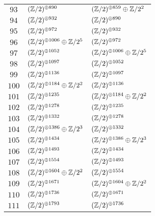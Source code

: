 \begin{supertabular}{|c|p{5.5cm}|p{5.5cm}|}
$93$%
&$(\mathbb{Z}/2)^{\oplus890}$%
&$(\mathbb{Z}/2)^{\oplus859}\oplus\mathbb{Z}/2^{2}$\\

$94$%
&$(\mathbb{Z}/2)^{\oplus932}$%
&$(\mathbb{Z}/2)^{\oplus890}$\\

$95$%
&$(\mathbb{Z}/2)^{\oplus972}$%
&$(\mathbb{Z}/2)^{\oplus932}$\\

$96$%
&$(\mathbb{Z}/2)^{\oplus1006}\oplus\mathbb{Z}/2^{5}$%
&$(\mathbb{Z}/2)^{\oplus972}$\\

$97$%
&$(\mathbb{Z}/2)^{\oplus1052}$%
&$(\mathbb{Z}/2)^{\oplus1006}\oplus\mathbb{Z}/2^{5}$\\

$98$%
&$(\mathbb{Z}/2)^{\oplus1097}$%
&$(\mathbb{Z}/2)^{\oplus1052}$\\

$99$%
&$(\mathbb{Z}/2)^{\oplus1136}$%
&$(\mathbb{Z}/2)^{\oplus1097}$\\

$100$%
&$(\mathbb{Z}/2)^{\oplus1184}\oplus\mathbb{Z}/2^{2}$%
&$(\mathbb{Z}/2)^{\oplus1136}$\\

$101$%
&$(\mathbb{Z}/2)^{\oplus1235}$%
&$(\mathbb{Z}/2)^{\oplus1184}\oplus\mathbb{Z}/2^{2}$\\

$102$%
&$(\mathbb{Z}/2)^{\oplus1278}$%
&$(\mathbb{Z}/2)^{\oplus1235}$\\

$103$%
&$(\mathbb{Z}/2)^{\oplus1332}$%
&$(\mathbb{Z}/2)^{\oplus1278}$\\

$104$%
&$(\mathbb{Z}/2)^{\oplus1386}\oplus\mathbb{Z}/2^{3}$%
&$(\mathbb{Z}/2)^{\oplus1332}$\\

$105$%
&$(\mathbb{Z}/2)^{\oplus1434}$%
&$(\mathbb{Z}/2)^{\oplus1386}\oplus\mathbb{Z}/2^{3}$\\

$106$%
&$(\mathbb{Z}/2)^{\oplus1493}$%
&$(\mathbb{Z}/2)^{\oplus1434}$\\

$107$%
&$(\mathbb{Z}/2)^{\oplus1554}$%
&$(\mathbb{Z}/2)^{\oplus1493}$\\

$108$%
&$(\mathbb{Z}/2)^{\oplus1604}\oplus\mathbb{Z}/2^{2}$%
&$(\mathbb{Z}/2)^{\oplus1554}$\\

$109$%
&$(\mathbb{Z}/2)^{\oplus1671}$%
&$(\mathbb{Z}/2)^{\oplus1604}\oplus\mathbb{Z}/2^{2}$\\

$110$%
&$(\mathbb{Z}/2)^{\oplus1736}$%
&$(\mathbb{Z}/2)^{\oplus1671}$\\

$111$%
&$(\mathbb{Z}/2)^{\oplus1793}$%
&$(\mathbb{Z}/2)^{\oplus1736}$\\


\end{supertabular}
